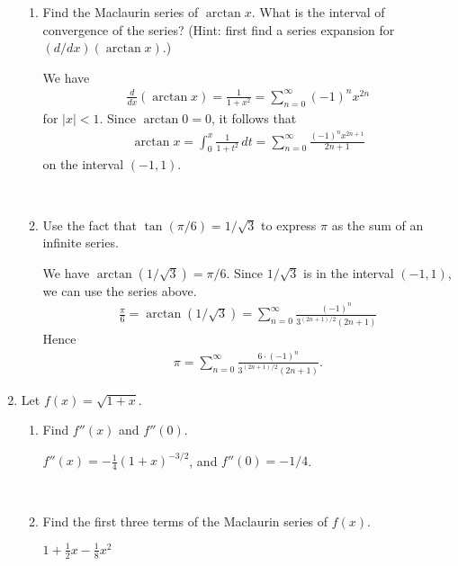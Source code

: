 \documentclass[]{handout}
\begin{document}
\begin{enumerate}[(1)]
\begin{enumerate}
		\item Find the Maclaurin series of $\arctan x$.  What is the interval of
			convergence of the series?  (Hint: first find a
			series expansion for $(d/dx)(\arctan x)$.)

\begin{solution} We have
		\begin{align*}
			\frac{d}{dx}(\arctan x) = \frac{1}{1+x^2} = \sum_{n=0}^\infty (-1)^n x^{2n}
		\end{align*}
		for $|x| < 1$.  Since $\arctan 0 = 0$, it follows that
		\begin{align*}
			\arctan x = \int_0^x \frac{1}{1+t^2}\,dt
				= \sum_{n=0}^\infty \frac{(-1)^n x^{2n+1}}{2n+1}
		\end{align*}
		on the interval $(-1,1)$.
\end{solution}

		\

		\item Use the fact that $\tan(\pi/6) = 1/\sqrt{3}$ to express $\pi$ as the
			sum of an infinite series.

\begin{solution}
		 We have $\arctan(1/\sqrt 3) = \pi /6$.  Since $1/\sqrt 3$ is in the
		interval $(-1,1)$, we can use the series above.
		\begin{align*}
			\frac{\pi}{6} = \arctan(1/\sqrt{3}) =
				\sum_{n=0}^\infty \frac{(-1)^n}{3^{(2n+1)/2}(2n+1)}
		\end{align*}
		Hence
		\begin{align*}
			\pi = \sum_{n=0}^\infty \frac{6 \cdot (-1)^n}{3^{(2n+1)/2}(2n+1)}.
		\end{align*}
\end{solution}

	\end{enumerate}


	\item Let $f(x) = \sqrt{1+x}$. %
	\begin{enumerate}
		\item Find $f''(x)$ and $f''(0)$.

\begin{answer}
		 $f''(x) = -\frac{1}{4}(1+x)^{-3/2}$, and $f''(0) = -1/4$.
\end{answer}

		\

		\item Find the first three terms of the Maclaurin series of $f(x)$.

\begin{answer} 
		$1 + \frac{1}{2} x - \frac{1}{8} x^2$
\end{answer}


\end{enumerate}
\end{enumerate}
\end{document}
